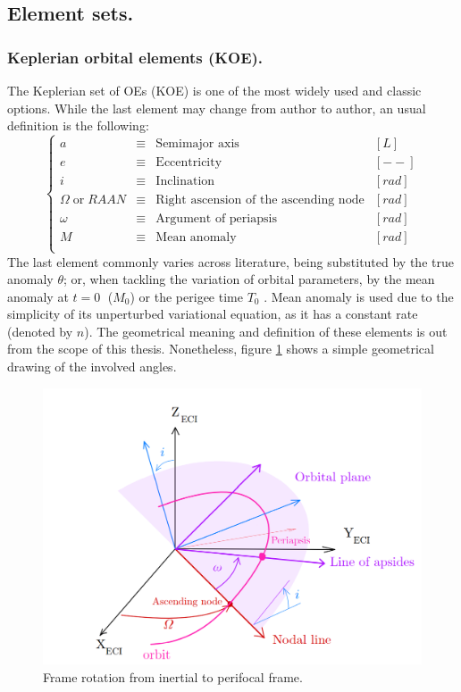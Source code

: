 	\subsection{Element sets.}
	\subsubsection{Keplerian orbital elements (KOE).}
	\indent The Keplerian set of OEs (KOE) is one of the most widely used and classic options. While the last element may change from author to author, an usual definition is the following:
	\begin{equation}
	\left\{ 
	\begin{array}{llll}
	a & \equiv & \text{Semimajor axis} & [L]\\
	e & \equiv & \text{Eccentricity} & [--]\\
	i & \equiv & \text{Inclination} & [rad]\\
	\Omega \; \text{or} \; RAAN & \equiv & \text{Right ascension of the ascending node} & [rad]\\
	\omega & \equiv & \text{Argument of periapsis} & [rad]\\
	M & \equiv & \text{Mean anomaly} & [rad]\\
	\end{array}
	\right.
	\end{equation}
	\indent The last element commonly varies across literature, being substituted by the true anomaly $\theta$; or, when tackling the variation of orbital parameters, by the mean anomaly at $t = 0 \; $ ($M_0$) or the perigee time $T_0$ \cite{Wiesel}. Mean anomaly is used due to the simplicity of its unperturbed variational equation, as it has a constant rate (denoted by $n$). The geometrical meaning and definition of these elements is out from the scope of this thesis. Nonetheless, figure \ref{fig: 	orbit_angles} shows a simple geometrical drawing of the involved angles.\\
    \begin{figure}[!htb]
    \centering\includegraphics[width = 0.7\linewidth]{Appendices/Appendix_A/orbit_angles}
    \caption{Frame rotation from inertial to perifocal frame.}
    \label{fig: 	orbit_angles}
	\end{figure}
